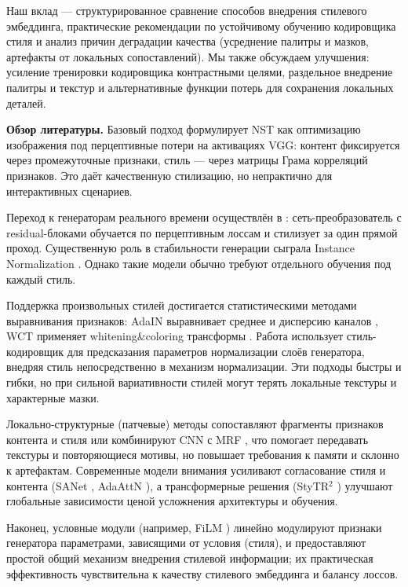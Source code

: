 \documentclass{article}
\begin{document}
Наш вклад — структурированное сравнение способов внедрения стилевого эмбеддинга, практические рекомендации по устойчивому обучению кодировщика стиля и анализ причин деградации качества (усреднение палитры и мазков, артефакты от локальных сопоставлений). Мы также обсуждаем улучшения: усиление тренировки кодировщика контрастными целями, раздельное внедрение палитры и текстур и альтернативные функции потерь для сохранения локальных деталей.

\medskip
\noindent\textbf{Обзор литературы.}
Базовый подход \citet{gatys2015} формулирует NST как оптимизацию изображения под перцептивные потери на активациях VGG: контент фиксируется через промежуточные признаки, стиль — через матрицы Грама корреляций признаков. Это даёт качественную стилизацию, но непрактично для интерактивных сценариев.

Переход к генераторам реального времени осуществлён в \citet{johnson2016}: сеть-преобразователь с residual-блоками обучается по перцептивным лоссам и стилизует за один прямой проход. Существенную роль в стабильности генерации сыграла Instance Normalization \citep{ulyanov2016instnorm}. Однако такие модели обычно требуют отдельного обучения под каждый стиль.

Поддержка произвольных стилей достигается статистическими методами выравнивания признаков: AdaIN выравнивает среднее и дисперсию каналов \citep{huang2017adain}, WCT применяет whitening\&coloring трансформы \citep{li2017wct}. Работа \citet{ghiasi2017magentanet} использует стиль-кодировщик для предсказания параметров нормализации слоёв генератора, внедряя стиль непосредственно в механизм нормализации. Эти подходы быстры и гибки, но при сильной вариативности стилей могут терять локальные текстуры и характерные мазки.

Локально-структурные (патчевые) методы сопоставляют фрагменты признаков контента и стиля \citep{chen2016fastpatch} или комбинируют CNN с MRF \citep{li2016cnnmrf}, что помогает передавать текстуры и повторяющиеся мотивы, но повышает требования к памяти и склонно к артефактам. Современные модели внимания усиливают согласование стиля и контента (SANet \citep{li2019sanet}, AdaAttN \citep{he2019adaattn}), а трансформерные решения (StyTR$^2$ \citep{xia2022stytr}) улучшают глобальные зависимости ценой усложнения архитектуры и обучения.

Наконец, условные модули (например, FiLM \citep{perez2018film}) линейно модулируют признаки генератора параметрами, зависящими от условия (стиля), и предоставляют простой общий механизм внедрения стилевой информации; их практическая эффективность чувствительна к качеству стилевого эмбеддинга и балансу лоссов.
\end{document}
